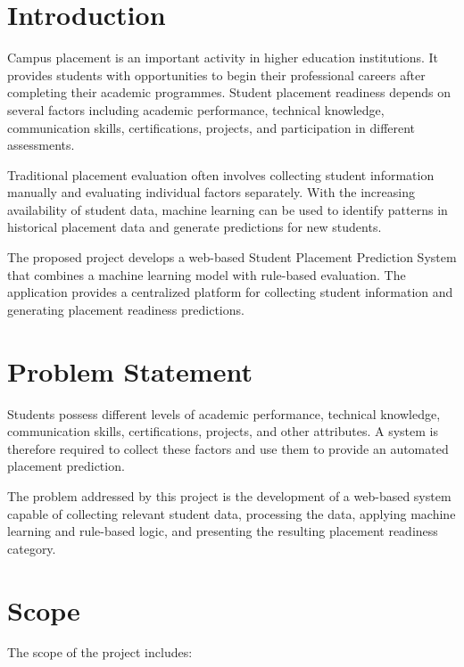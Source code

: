 \documentclass[12pt,a4paper]{report}
\begin{document}
\section{Introduction}

Campus placement is an important activity in higher education
institutions. It provides students with opportunities to begin
their professional careers after completing their academic
programmes. Student placement readiness depends on several
factors including academic performance, technical knowledge,
communication skills, certifications, projects, and participation
in different assessments.

Traditional placement evaluation often involves collecting
student information manually and evaluating individual factors
separately. With the increasing availability of student data,
machine learning can be used to identify patterns in historical
placement data and generate predictions for new students.

The proposed project develops a web-based Student Placement
Prediction System that combines a machine learning model with
rule-based evaluation. The application provides a centralized
platform for collecting student information and generating
placement readiness predictions.


\section{Problem Statement}

Students possess different levels of academic performance,
technical knowledge, communication skills, certifications,
projects, and other attributes. A system is therefore required
to collect these factors and use them to provide an automated
placement prediction.

The problem addressed by this project is the development of a
web-based system capable of collecting relevant student data,
processing the data, applying machine learning and rule-based
logic, and presenting the resulting placement readiness
category.


\section{Scope}

The scope of the project includes:
\end{document}
